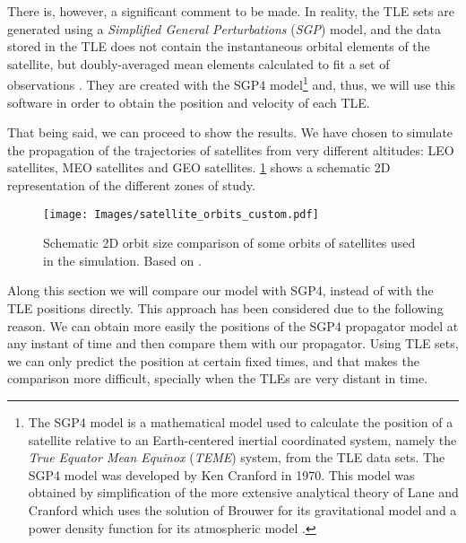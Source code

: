 \documentclass[../main.tex]{subfiles}
\begin{document}
There is, however, a significant comment to be made. In reality, the TLE sets are generated using a \emph{Simplified General Perturbations} (\emph{SGP}) model, and the data stored in the TLE does not contain the instantaneous orbital elements of the satellite, but doubly-averaged mean elements calculated to fit a set of observations \cite{celestrak,celestrakReport,sgp4OrbitDet}.
They are created with the SGP4 model\footnote{The SGP4 model is a mathematical model used to calculate the position of a satellite relative to an Earth-centered inertial coordinated system, namely the \emph{True Equator Mean Equinox} (\emph{TEME}) system,  from the TLE data sets. The SGP4 model was developed by Ken Cranford in 1970. This model was obtained by simplification of the more extensive analytical theory of Lane and Cranford which uses the solution of Brouwer for its gravitational model and a power density function for its atmospheric model \cite{matlab}.} and, thus, we will use this software in order to obtain the position and velocity of each TLE.

That being said, we can proceed to show the results. We have chosen to simulate the propagation of the trajectories of satellites from very different altitudes: LEO satellites, MEO satellites and GEO satellites. \cref{fig:satellite_orbits} shows a schematic 2D representation of the different zones of study.
\begin{figure}[ht]
  \centering
  \texttt{[image: Images/satellite\_orbits\_custom.pdf]}
  \caption{Schematic 2D orbit size comparison of some orbits of satellites used in the simulation. Based on \cite{wiki:sat_orbits}.}
  \label{fig:satellite_orbits}
\end{figure}

Along this section we will compare our model with SGP4, instead of with the TLE positions directly. This approach has been considered due to the following reason. We can obtain more easily the positions of the SGP4 propagator model at any instant of time and then compare them with our propagator. Using TLE sets, we can only predict the position at certain fixed times, and that makes the comparison more difficult, specially when the TLEs are very distant in time.
\end{document}
